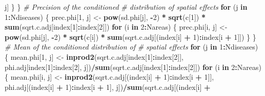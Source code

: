 \documentclass[]{article}
\newenvironment{Shaded}{\begin{snugshade}}{\end{snugshade}}
\newcommand{\KeywordTok}[1]{\textcolor[rgb]{0.13,0.29,0.53}{\textbf{#1}}}
\newcommand{\DecValTok}[1]{\textcolor[rgb]{0.00,0.00,0.81}{#1}}
\newcommand{\StringTok}[1]{\textcolor[rgb]{0.31,0.60,0.02}{#1}}
\newcommand{\CommentTok}[1]{\textcolor[rgb]{0.56,0.35,0.01}{\textit{#1}}}
\newcommand{\ControlFlowTok}[1]{\textcolor[rgb]{0.13,0.29,0.53}{\textbf{#1}}}
\newcommand{\OperatorTok}[1]{\textcolor[rgb]{0.81,0.36,0.00}{\textbf{#1}}}
\newcommand{\NormalTok}[1]{#1}
\begin{document}
\begin{Shaded}
\begin{Highlighting}[]
\NormalTok{                j]}
\NormalTok{        \}}
\NormalTok{    \}}
    \CommentTok{# Precision of the conditioned}
    \CommentTok{# distribution of spatial effects}
    \ControlFlowTok{for}\NormalTok{ (j }\ControlFlowTok{in} \DecValTok{1}\OperatorTok{:}\NormalTok{Ndiseases) \{}
\NormalTok{        prec.phi[}\DecValTok{1}\NormalTok{, j] <-}\StringTok{ }\KeywordTok{pow}\NormalTok{(sd.phi[j], }
            \OperatorTok{-}\DecValTok{2}\NormalTok{) }\OperatorTok{*}\StringTok{ }\KeywordTok{sqrt}\NormalTok{(c[}\DecValTok{1}\NormalTok{]) }\OperatorTok{*}\StringTok{ }\KeywordTok{sum}\NormalTok{(sqrt.c.adj[index[}\DecValTok{1}\NormalTok{]}\OperatorTok{:}\NormalTok{index[}\DecValTok{2}\NormalTok{]])}
        \ControlFlowTok{for}\NormalTok{ (i }\ControlFlowTok{in} \DecValTok{2}\OperatorTok{:}\NormalTok{Nareas) \{}
\NormalTok{            prec.phi[i, j] <-}\StringTok{ }\KeywordTok{pow}\NormalTok{(sd.phi[j], }
                \OperatorTok{-}\DecValTok{2}\NormalTok{) }\OperatorTok{*}\StringTok{ }\KeywordTok{sqrt}\NormalTok{(c[i]) }\OperatorTok{*}\StringTok{ }\KeywordTok{sum}\NormalTok{(sqrt.c.adj[(index[i] }\OperatorTok{+}\StringTok{ }
\StringTok{                }\DecValTok{1}\NormalTok{)}\OperatorTok{:}\NormalTok{index[i }\OperatorTok{+}\StringTok{ }\DecValTok{1}\NormalTok{]])}
\NormalTok{        \}}
\NormalTok{    \}}
    \CommentTok{# Mean of the conditioned distribution of}
    \CommentTok{# spatial effects}
    \ControlFlowTok{for}\NormalTok{ (j }\ControlFlowTok{in} \DecValTok{1}\OperatorTok{:}\NormalTok{Ndiseases) \{}
\NormalTok{        mean.phi[}\DecValTok{1}\NormalTok{, j] <-}\StringTok{ }\KeywordTok{inprod2}\NormalTok{(sqrt.c.adj[index[}\DecValTok{1}\NormalTok{]}\OperatorTok{:}\NormalTok{index[}\DecValTok{2}\NormalTok{]], }
\NormalTok{            phi.adj[index[}\DecValTok{1}\NormalTok{]}\OperatorTok{:}\NormalTok{index[}\DecValTok{2}\NormalTok{], j])}\OperatorTok{/}\KeywordTok{sum}\NormalTok{(sqrt.c.adj[index[}\DecValTok{1}\NormalTok{]}\OperatorTok{:}\NormalTok{index[}\DecValTok{2}\NormalTok{]])}
        \ControlFlowTok{for}\NormalTok{ (i }\ControlFlowTok{in} \DecValTok{2}\OperatorTok{:}\NormalTok{Nareas) \{}
\NormalTok{            mean.phi[i, j] <-}\StringTok{ }\KeywordTok{inprod2}\NormalTok{(sqrt.c.adj[(index[i] }\OperatorTok{+}\StringTok{ }
\StringTok{                }\DecValTok{1}\NormalTok{)}\OperatorTok{:}\NormalTok{index[i }\OperatorTok{+}\StringTok{ }\DecValTok{1}\NormalTok{]], phi.adj[(index[i] }\OperatorTok{+}\StringTok{ }
\StringTok{                }\DecValTok{1}\NormalTok{)}\OperatorTok{:}\NormalTok{index[i }\OperatorTok{+}\StringTok{ }\DecValTok{1}\NormalTok{], j])}\OperatorTok{/}\KeywordTok{sum}\NormalTok{(sqrt.c.adj[(index[i] }\OperatorTok{+}\StringTok{ }

\end{Highlighting}
\end{Shaded}
\end{document}
